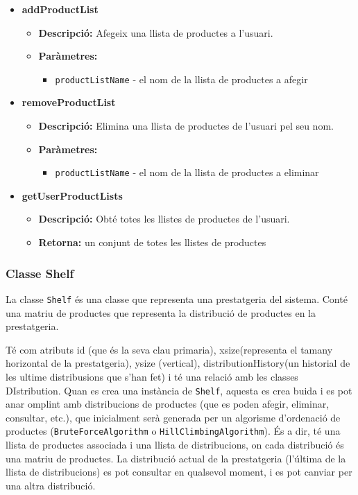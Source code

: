 \documentclass[a4paper, t]{article}
\begin{document}
\begin{itemize}
    \item \textbf{addProductList}
    \begin{itemize}
        \item \textbf{Descripció:} Afegeix una llista de productes a l'usuari.
        \item \textbf{Paràmetres:}
        \begin{itemize}
            \item \texttt{productListName} - el nom de la llista de productes a afegir
        \end{itemize}
    \end{itemize}

    \item \textbf{removeProductList}
    \begin{itemize}
        \item \textbf{Descripció:} Elimina una llista de productes de l'usuari pel seu nom.
        \item \textbf{Paràmetres:}
        \begin{itemize}
            \item \texttt{productListName} - el nom de la llista de productes a eliminar
        \end{itemize}
    \end{itemize}

    \item \textbf{getUserProductLists}
    \begin{itemize}
        \item \textbf{Descripció:} Obté totes les llistes de productes de l'usuari.
        \item \textbf{Retorna:} un conjunt de totes les llistes de productes
    \end{itemize}
\end{itemize}

\subsubsection{Classe Shelf}
La classe \texttt{Shelf} és una classe que representa una prestatgeria del sistema. 
Conté una matriu de productes que representa la distribució de productes en la prestatgeria. 

Té com atributs id (que és la seva clau primaria), xsize(representa el tamany horizontal de la prestatgeria), ysize (vertical), 
distributionHistory(un historial de les ultime distribusions que s’han fet) i té una relació amb les classes DIstribution.
Quan es crea una instància de \texttt{Shelf}, aquesta es crea buida i es pot anar omplint amb distribucions de productes (que es poden afegir, eliminar, consultar, etc.), 
que inicialment serà generada per un algorisme d’ordenació de productes (\texttt{BruteForceAlgorithm} o \texttt{HillClimbingAlgorithm}). 
És a dir, té una llista de productes associada i una llista de distribucions, on cada distribució és una matriu de productes. 
La distribució actual de la prestatgeria (l’última de la llista de distribucions) es pot consultar en qualsevol moment, i es pot canviar per una altra distribució.
\end{document}

